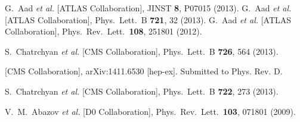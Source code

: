 \documentclass[aps,prl,twocolumn,preprintnumbers,groupedaddress,nofootinbib]{revtex4}
\begin{document}
\begin{thebibliography}{99}
  G.~Aad {\it et al.}  [ATLAS Collaboration],
  JINST {\bf 8}, P07015 (2013).
  G.~Aad {\it et al.}  [ATLAS Collaboration],
  Phys.\ Lett.\ B {\bf 721}, 32 (2013).
  G.~Aad {\it et al.}  [ATLAS Collaboration],
  Phys.\ Rev.\ Lett.\  {\bf 108}, 251801 (2012).
  
  S.~Chatrchyan {\it et al.}  [CMS Collaboration],
  Phys.\ Lett.\ B {\bf 726}, 564 (2013).

  [CMS Collaboration],
  arXiv:1411.6530 [hep-ex]. Submitted to Phys. Rev. D.

  S.~Chatrchyan {\it et al.}  [CMS Collaboration],
  Phys.\ Lett.\ B {\bf 722}, 273 (2013).
  
  V.~M.~Abazov {\it et al.}  [D0 Collaboration],
  Phys.\ Rev.\ Lett.\  {\bf 103}, 071801 (2009).
  

\end{thebibliography}
\end{document}
